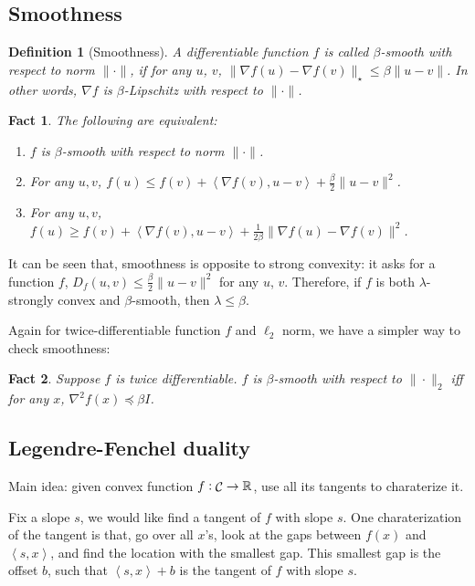 \documentclass{article}
\newtheorem{definition}{Definition}
\newtheorem{fact}{Fact}
\DeclareMathOperator*{\Ccal}{{\cal C}}
\newcommand{\RR}{\mathbb{R}} %
\newcommand{\inner}[2]{\left\langle #1,#2 \right\rangle}
\begin{document}
\subsection{Smoothness}

\begin{definition}[Smoothness]
A differentiable function $f$ is called $\beta$-smooth with respect to norm $\|\cdot \|$, if for any $u$, $v$,
$\| \nabla f(u) - \nabla f(v) \|_\star \leq \beta \| u - v \|$.
In other words, $\nabla f$ is $\beta$-Lipschitz with respect to $\| \cdot \|$.
\end{definition}

\begin{fact}
The following are equivalent:
\begin{enumerate}
  \item $f$ is $\beta$-smooth with respect to norm $\| \cdot \|$.
  \item For any $u, v$, $f(u) \leq f(v) + \inner{\nabla f(v)}{u - v} + \frac{\beta}{2}\| u - v \|^2$.
  \item For any $u, v$, $f(u) \geq f(v) + \inner{\nabla f(v)}{u - v} + \frac{1}{2\beta} \| \nabla f(u) - \nabla f(v) \|^2$.
\end{enumerate}
\end{fact}

It can be seen that, smoothness is opposite to strong convexity: it asks for a function $f$, $D_f(u, v) \leq \frac{\beta}{2}\| u - v\|^2$ for any $u$, $v$. Therefore, if $f$ is both $\lambda$-strongly convex and $\beta$-smooth, then $\lambda \leq \beta$.

Again for twice-differentiable function $f$ and $\ell_2$ norm, we have a simpler way
to check smoothness:
\begin{fact}
Suppose $f$ is twice differentiable.
$f$ is $\beta$-smooth with respect to $\| \cdot \|_2$ iff for any $x$,
$\nabla^2 f(x) \preceq \beta I$.
\end{fact}

\subsection{Legendre-Fenchel duality}

Main idea: given convex function $f: \Ccal \to \RR$, use all its tangents to charaterize it.

Fix a slope $s$, we would like find a tangent of $f$ with slope $s$. One charaterization of the tangent is that, go over all $x$'s, look at the gaps between $f(x)$ and $\inner{s}{x}$, and find the location with the smallest gap. This smallest gap is the offset $b$, such that $\inner{s}{x} + b$ is the tangent of $f$ with slope $s$.
\end{document}
